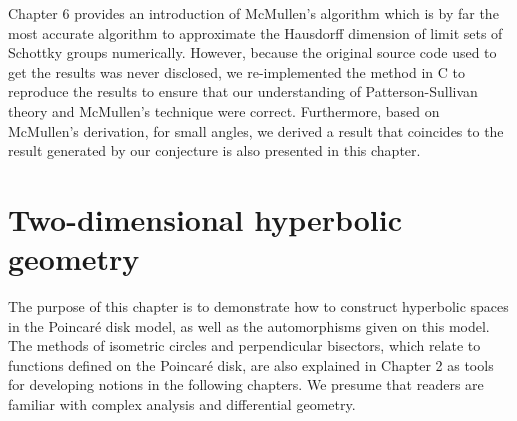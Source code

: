 \documentclass[12pt,oneside]{sfsuthesis}
\theoremstyle{plain} %
\theoremstyle{definition}  %
\theoremstyle{remark}  %
\theoremstyle{plain}
\begin{document}
{Chapter 6 provides an introduction of McMullen's algorithm which is by far the most accurate algorithm to approximate the Hausdorff dimension of limit sets of Schottky groups numerically. However, because the original source code used to get the results was never disclosed, we re-implemented the method in C to reproduce the results to ensure that our understanding of Patterson-Sullivan theory and McMullen's technique were correct. Furthermore, based on McMullen's derivation, for small angles, we derived a result that coincides to the result generated by our conjecture is also presented in this chapter.












\chapter{Two-dimensional hyperbolic geometry}


The purpose of this chapter is to demonstrate how to construct hyperbolic spaces in the Poincar\'{e} disk model, as well as the automorphisms given on this model. The methods of isometric circles and perpendicular bisectors, which relate to functions defined on the Poincar\'{e} disk, are also explained in Chapter 2 as tools for developing notions in the following chapters. We presume that readers are familiar with complex analysis and differential geometry.

}
\end{document}
